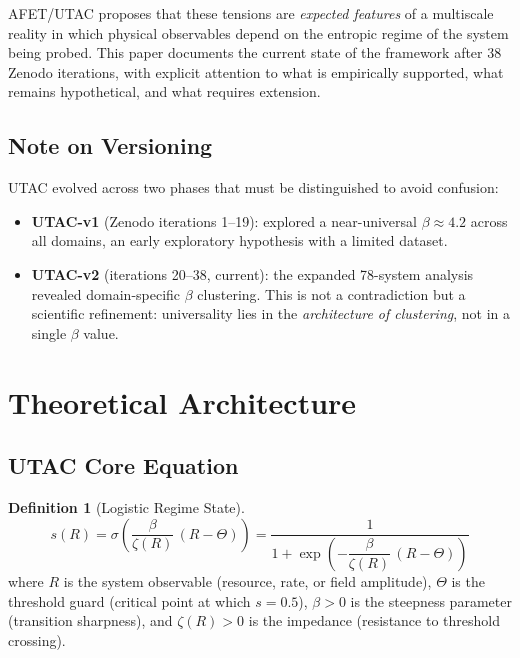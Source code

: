 \documentclass[12pt,a4paper]{article}
\theoremstyle{definition}
\newtheorem{definition}{Definition}
\begin{document}
AFET/UTAC proposes that these tensions are \emph{expected features} of a multiscale
reality in which physical observables depend on the entropic regime of the system being
probed. This paper documents the current state of the framework after 38 Zenodo iterations,
with explicit attention to what is empirically supported, what remains hypothetical, and
what requires extension.

\subsection*{Note on Versioning}

UTAC evolved across two phases that must be distinguished to avoid confusion:
\begin{itemize}[leftmargin=1.8em]
  \item \textbf{UTAC-v1} (Zenodo iterations 1--19): explored a near-universal $\beta \approx 4.2$
        across all domains, an early exploratory hypothesis with a limited dataset.
  \item \textbf{UTAC-v2} (iterations 20--38, current): the expanded 78-system analysis
        revealed domain-specific $\beta$ clustering. This is not a contradiction but a
        scientific refinement: universality lies in the \emph{architecture of clustering},
        not in a single $\beta$ value.
\end{itemize}

\section{Theoretical Architecture}

\subsection{UTAC Core Equation}

\begin{definition}[Logistic Regime State]
\begin{equation}
  s(R) = \sigma\!\left(\frac{\beta}{\zeta(R)}\,(R - \Theta)\right)
       = \frac{1}{1 + \exp\!\left(-\dfrac{\beta}{\zeta(R)}\,(R-\Theta)\right)}
  \label{eq:utac}
\end{equation}
where $R$ is the system observable (resource, rate, or field amplitude),
$\Theta$ is the threshold guard (critical point at which $s=0.5$),
$\beta > 0$ is the steepness parameter (transition sharpness),
and $\zeta(R) > 0$ is the impedance (resistance to threshold crossing).
\end{definition}
\end{document}

